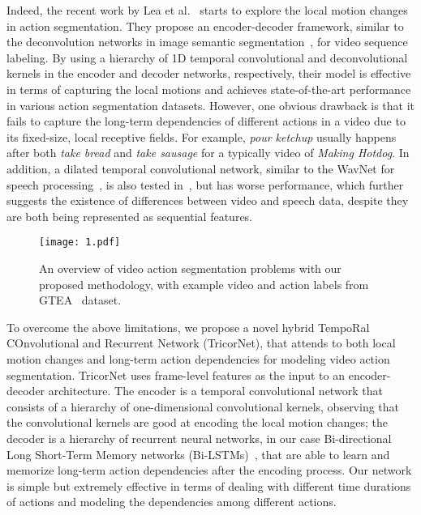 \documentclass{article}
\begin{document}
Indeed, the recent work by Lea et al.~\cite{LeFlViCVPR2017} starts to explore the local motion changes in action segmentation. They propose an encoder-decoder framework, similar to the deconvolution networks in image semantic segmentation~\cite{NoHoHaICCV2015}, for video sequence labeling. By using a hierarchy of 1D temporal convolutional and deconvolutional kernels in the encoder and decoder networks, respectively, their model is effective in terms of capturing the local motions and achieves state-of-the-art performance in various action segmentation datasets. However, one obvious drawback is that it fails to capture the long-term dependencies of different actions in a video due to its fixed-size, local receptive fields. For example, \textit{pour ketchup} usually happens after both \textit{take bread} and \textit{take sausage} for a typically video of \textit{Making Hotdog}. In addition, a dilated temporal convolutional network, similar to the WavNet for speech processing~\cite{OoDiZeARXIV2016}, is also tested in~\cite{LeFlViCVPR2017}, but has worse performance, which further suggests the existence of differences between video and speech data, despite they are both being represented as sequential features. 

\begin{figure}[t]
\centering
\texttt{[image: 1.pdf]}
\caption{An overview of video action segmentation problems with our proposed methodology, with example video and action labels from GTEA~\cite{gtea} dataset.}
\label{f1}
\end{figure}

To overcome the above limitations, we propose a novel hybrid TempoRal COnvolutional and Recurrent Network (TricorNet), that attends to both local motion changes and long-term action dependencies for modeling video action segmentation. TricorNet uses frame-level features as the input to an encoder-decoder architecture. The encoder is a temporal convolutional network that consists of a hierarchy of one-dimensional convolutional kernels, observing that the convolutional kernels are good at encoding the local motion changes; the decoder is a hierarchy of recurrent neural networks, in our case Bi-directional Long Short-Term Memory networks (Bi-LSTMs)~\cite{graves2005bidirectional}, that are able to learn and memorize long-term action dependencies after the encoding process. Our network is simple but extremely effective in terms of dealing with different time durations of actions and modeling the dependencies among different actions. 
\end{document}
